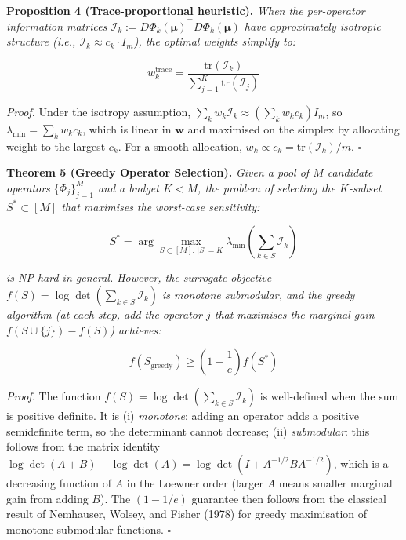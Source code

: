 \documentclass[journal]{IEEEtran}
\begin{document}
\textbf{Proposition 4 (Trace-proportional heuristic).} \textit{When the per-operator information matrices $\mathcal{I}_k := D\Phi_k(\boldsymbol{\mu})^\top D\Phi_k(\boldsymbol{\mu})$ have approximately isotropic structure (i.e., $\mathcal{I}_k \approx c_k \cdot I_m$), the optimal weights simplify to:}

\begin{equation}
w_k^{\text{trace}} = \frac{\text{tr}(\mathcal{I}_k)}{\sum_{j=1}^K \text{tr}(\mathcal{I}_j)}
\label{eq:trace_weights}
\end{equation}

\textit{Proof.} Under the isotropy assumption, $\sum_k w_k \mathcal{I}_k \approx (\sum_k w_k c_k) I_m$, so $\lambda_{\min} = \sum_k w_k c_k$, which is linear in $\mathbf{w}$ and maximised on the simplex by allocating weight to the largest $c_k$. For a smooth allocation, $w_k \propto c_k = \text{tr}(\mathcal{I}_k)/m$. $\square$

\vspace{0.5em}

\textbf{Theorem 5 (Greedy Operator Selection).} \textit{Given a pool of $M$ candidate operators $\{\Phi_j\}_{j=1}^M$ and a budget $K < M$, the problem of selecting the $K$-subset $S^* \subset [M]$ that maximises the worst-case sensitivity:}

\begin{equation}
S^* = \arg\max_{S \subset [M],\, |S|=K} \lambda_{\min}\!\left(\textstyle\sum_{k \in S} \mathcal{I}_k\right)
\label{eq:selection}
\end{equation}

\textit{is NP-hard in general. However, the surrogate objective $f(S) = \log\det\!\left(\sum_{k \in S} \mathcal{I}_k\right)$ is monotone submodular, and the greedy algorithm (at each step, add the operator $j$ that maximises the marginal gain $f(S \cup \{j\}) - f(S)$) achieves:}

\begin{equation}
f(S_{\text{greedy}}) \geq \left(1 - \frac{1}{e}\right) f(S^*)
\label{eq:greedy_bound}
\end{equation}

\textit{Proof.} The function $f(S) = \log\det(\sum_{k \in S} \mathcal{I}_k)$ is well-defined when the sum is positive definite. It is (i) \textit{monotone}: adding an operator adds a positive semidefinite term, so the determinant cannot decrease; (ii) \textit{submodular}: this follows from the matrix identity $\log\det(A + B) - \log\det(A) = \log\det(I + A^{-1/2}BA^{-1/2})$, which is a decreasing function of $A$ in the Loewner order (larger $A$ means smaller marginal gain from adding $B$). The $(1-1/e)$ guarantee then follows from the classical result of Nemhauser, Wolsey, and Fisher (1978) for greedy maximisation of monotone submodular functions. $\square$
\end{document}
